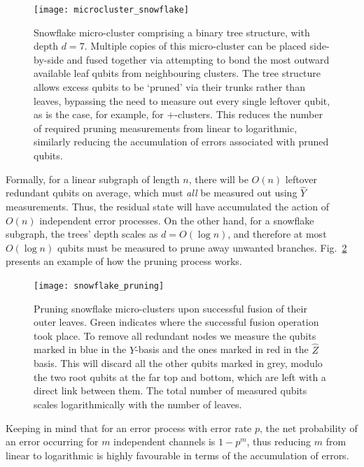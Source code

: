 \begin{figure}[!htbp]
\texttt{[image: microcluster\_snowflake]}
\captionspacefig \caption{Snowflake micro-cluster comprising a binary tree structure, with depth \mbox{$d=7$}. Multiple copies of this micro-cluster can be placed side-by-side and fused together via attempting to bond the most outward available leaf qubits from neighbouring clusters. The tree structure allows excess qubits to be `pruned' via their trunks rather than leaves, bypassing the need to measure out every single leftover qubit, as is the case, for example, for $+$-clusters. This reduces the number of required pruning measurements from linear to logarithmic, similarly reducing the accumulation of errors associated with pruned qubits.} \label{fig:snowflake_graph}
\end{figure}

Formally, for a linear subgraph of length $n$, there will be $O(n)$ leftover redundant qubits on average, which must \textit{all} be measured out using $\hat{Y}$ measurements. Thus, the residual state will have accumulated the action of $O(n)$ independent error processes. On the other hand, for a snowflake subgraph, the trees' depth scales as \mbox{$d=O(\log n)$}, and therefore at most \mbox{$O(\log n)$} qubits must be measured to prune away unwanted branches. Fig.~\ref{fig:snowflake_pruning} presents an example of how the pruning process works.

\begin{figure}[!htbp]
\texttt{[image: snowflake\_pruning]}
\captionspacefig \caption{Pruning snowflake micro-clusters upon successful fusion of their outer leaves. Green indicates where the successful fusion operation took place. To remove all redundant nodes we measure the qubits marked in blue in the $\hat{Y}$-basis and the ones marked in red in the $\hat{Z}$ basis. This will discard all the other qubits marked in grey, modulo the two root qubits at the far top and bottom, which are left with a direct link between them. The total number of measured qubits scales logarithmically with the number of leaves.}\label{fig:snowflake_pruning}	
\end{figure}

Keeping in mind that for an error process with error rate $p$, the net probability of an error occurring for $m$ independent channels is \mbox{$1-p^m$}, thus reducing $m$ from linear to logarithmic is highly favourable in terms of the accumulation of errors.

